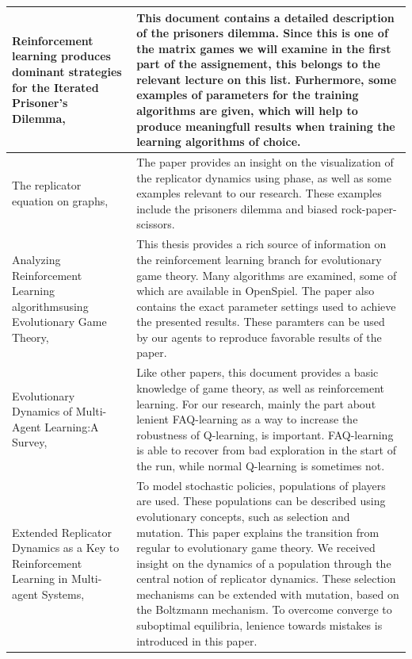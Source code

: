 \documentclass[10pt,a4paper]{article}
\begin{document}
\begin{longtable}{|p{5cm}|p{10cm}|}
\hline  
Reinforcement learning produces dominant strategies for the Iterated Prisoner’s Dilemma, \citet{rlforpd} & 
This document contains a detailed description of the prisoners dilemma. Since this is one of the matrix games we will examine in the first part of the assignement, this belongs to the relevant lecture on this list. Furhermore, some examples of parameters for the training algorithms are given, which will help to produce meaningfull results when training the learning algorithms of choice.\\ 
\hline 
The replicator equation on graphs, \citet{Ohtsuki2006TheRE} & The paper provides an insight on the visualization of the replicator dynamics using phase, as well as some examples relevant to our research. These examples include the prisoners dilemma and biased rock-paper-scissors.\\
\hline
Analyzing Reinforcement Learning algorithmsusing Evolutionary Game Theory, \citet{bloembergenmaster} & This thesis provides a rich source of information on the reinforcement learning branch for evolutionary game theory. Many algorithms are examined, some of which are available in OpenSpiel. The paper also contains the exact parameter settings used to achieve the presented results. These paramters can be used by our agents to reproduce favorable results of the paper. \\
\hline
Evolutionary Dynamics of Multi-Agent Learning:A Survey, \citet{evoldynamics} & Like other papers, this document provides a basic knowledge of game theory, as well as reinforcement learning. For our research, mainly the part about lenient FAQ-learning as a way to increase the robustness of Q-learning, is important. FAQ-learning is able to recover from bad exploration in the start of the run, while normal Q-learning is sometimes not. \\
\hline
Extended Replicator Dynamics as a Key to Reinforcement Learning in Multi-agent Systems, \citet{extrepl} & To model stochastic policies, populations of players are used. These populations can be described using evolutionary concepts, such as selection and mutation. This paper explains the transition from regular to evolutionary game theory. We received insight on the dynamics of a population through the central notion of replicator dynamics. These selection mechanisms can be extended with mutation, based on the Boltzmann mechanism. To overcome converge to suboptimal equilibria, lenience towards mistakes is introduced in this paper.
\\ 
\hline
\end{longtable} 
\end{document}
